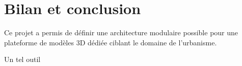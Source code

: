 \chapter{Bilan et conclusion}
\label{Chapter4}

Ce projet a permis de définir une architecture modulaire possible pour une plateforme de modèles 3D dédiée ciblant le domaine de l'urbanisme.

Un tel outil